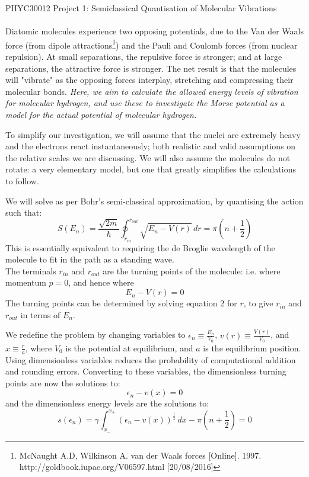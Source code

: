 \documentclass[10pt]{article}
\begin{document}
\begin{center} {\Large PHYC30012 Project 1: Semiclassical Quantisation of Molecular Vibrations} \end{center}


{\small
\paragraph{}
Diatomic molecules experience two opposing potentials, due to the Van der Waals force (from dipole attractions\footnote{McNaught A.D, Wilkinson A. van der Waals forces [Online]. 1997. http://goldbook.iupac.org/V06597.html [20/08/2016]}) and the Pauli and Coulomb forces (from nuclear repulsion). At small separations, the repulsive force is stronger; and at large separations, the attractive force is stronger. The net result is that the molecules will "vibrate" as the opposing forces interplay, stretching and compressing their molecular bonds. \emph{Here, we aim to calculate the allowed energy levels of vibration for molecular hydrogen, and use these to investigate the Morse potential as a model for the actual potential of molecular hydrogen.}

To simplify our investigation, we will assume that the nuclei are extremely heavy and the electrons react instantaneously; both realistic and valid assumptions on the relative scales we are discussing. We will also assume the molecules do not rotate: a very elementary model, but one that greatly simplifies the calculations to follow.

We will solve as per Bohr's semi-classical approximation, by quantising the action such that:
\begin{equation} S(E_n) = \frac{\sqrt{2m}}{\hbar} \oint_{r_{in}}^{r_{out}} \sqrt{E_n-V(r)} \, dr = \pi(n+\frac{1}{2}) \end{equation}
This is essentially equivalent to requiring the de Broglie wavelength of the molecule to fit in the path as a standing wave.\\
The terminals $r_{in}$ and $r_{out}$ are the turning points of the molecule: i.e. where momentum $p=0$, and hence where
\begin{equation} E_n - V(r) = 0 \end{equation}
The turning points can be determined by solving equation 2 for $r$, to give $r_{in}$ and $r_{out}$ in terms of $E_n$. 

We redefine the problem by changing variables to $\epsilon_n \equiv \frac{E_n}{V_0}$, $v(r) \equiv \frac{V(r)}{V_0}$, and $x \equiv \frac{r}{a}$, where $V_0$ is the potential at equilibrium, and $a$ is the equilibrium position. Using dimensionless variables reduces the probability of computational addition and rounding errors. Converting to these variables, the dimensionless turning points are now the solutions to:
\begin{equation} \epsilon_n - v(x) = 0 \end{equation}
and the dimensionless energy levels are the solutions to:
\begin{equation} s(\epsilon_n) = \gamma \int_{x_{-}}^{x_+} (\epsilon_n - v(x))^{\frac{1}{2}} \, dx - \pi(n+\frac{1}{2}) = 0 \end{equation}

}
\end{document}
